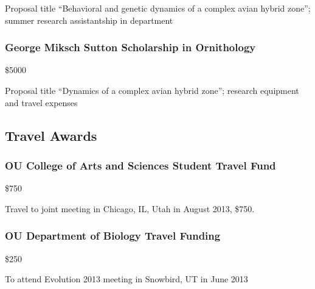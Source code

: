 \documentclass[
  letterpaper,
  DIV=11,
  numbers=noendperiod,
  oneside]{scrreprt}
\begin{document}
Proposal title ``Behavioral and genetic dynamics of a complex avian
hybrid zone''; summer research assistantship in department

\subsubsection{George Miksch Sutton Scholarship in
Ornithology}\label{george-miksch-sutton-scholarship-in-ornithology-3}

\$5000


Proposal title ``Dynamics of a complex avian hybrid zone''; research
equipment and travel expenses

\subsection{Travel Awards}\label{travel-awards}

\subsubsection{OU College of Arts and Sciences Student Travel
Fund}\label{ou-college-of-arts-and-sciences-student-travel-fund}

\$750


Travel to joint meeting in Chicago, IL, Utah in August 2013, \$750.

\subsubsection{OU Department of Biology Travel
Funding}\label{ou-department-of-biology-travel-funding}

\$250


To attend Evolution 2013 meeting in Snowbird, UT in June 2013
\end{document}
